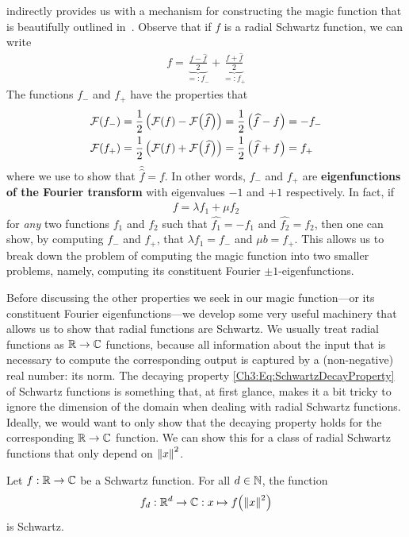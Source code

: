  indirectly provides us with a mechanism for constructing the magic function that is beautifully outlined in~\cite{CohnOnViazovskaICM}. Observe that if $f$ is a radial Schwartz function, we can write
\begin{align*}
    f = \underbrace{\frac{f - \hat{f}}{2}}_{=: f_{-}} + \underbrace{\frac{f + \hat{f}}{2}}_{=: f_{+}}
\end{align*}
The functions $f_{-}$ and $f_{+}$ have the properties that
\begin{align*}
    \mathcal{F}\!\left( f_{-} \right) &= \frac{1}{2} \left( \mathcal{F}\!\left( f \right) - \mathcal{F}\!\left( \widehat{f} \right) \right) = \frac{1}{2} \left( \widehat{f} - f \right) = -f_{-} \\
    \mathcal{F}\!\left( f_{+} \right) &= \frac{1}{2} \left( \mathcal{F}\!\left( f \right) + \mathcal{F}\!\left( \widehat{f} \right) \right) = \frac{1}{2} \left( \widehat{f} + f \right) = f_{+}
\end{align*}
where we use  to show that $\hat{\hat{f}} = f$. In other words, $f_{-}$ and $f_{+}$ are \textbf{eigenfunctions of the Fourier transform} with eigenvalues $-1$ and $+1$ respectively. In fact, if
\begin{align*}
    f = \lambda f_1 + \mu f_2
\end{align*}
for \textit{any} two functions $f_1$ and $f_2$ such that $\hat{f_1} = -f_1$ and $\hat{f_2} = f_2$, then one can show, by computing $f_{-}$ and $f_{+}$, that $\lambda f_1 = f_{-}$ and $\mu b = f_{+}$. This allows us to break down the problem of computing the magic function into two smaller problems, namely, computing its constituent Fourier $\pm 1$-eigenfunctions.

Before discussing the other properties we seek in our magic function---or its constituent Fourier eigenfunctions---we develop some very useful machinery that allows us to show that radial functions are Schwartz. We usually treat radial functions as $\mathbb{R} \to \mathbb{C}$ functions, because all information about the input that is necessary to compute the corresponding output is captured by a (non-negative) real number: its norm. The decaying property \eqref{Ch3:Eq:SchwartzDecayProperty} of Schwartz functions is something that, at first glance, makes it a bit tricky to ignore the dimension of the domain when dealing with radial Schwartz functions. Ideally, we would want to only show that the decaying property holds for the corresponding $\mathbb{R} \to \mathbb{C}$ function. We can show this for a class of radial Schwartz functions that only depend on $\left\lVert x \right\rVert^2$.

\begin{boxproposition}\label{Ch3:Prop:Multidimensional_Schwartz_of_Schwartz}
    Let $f : \mathbb{R} \to \mathbb{C}$ be a Schwartz function. For all $d \in \mathbb{N}$, the function
    \begin{align*}
        f_d : \mathbb{R}^d \to \mathbb{C} : x \mapsto f\!\left( \left\lVert x \right\rVert^2 \right)
    \end{align*}
    is Schwartz.
\end{boxproposition}

